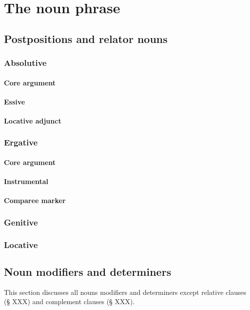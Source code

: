 \chapter{The noun phrase}

\section{Postpositions and relator nouns}

\subsection{Absolutive}
\subsubsection{Core argument}
\subsubsection{Essive}
\subsubsection{Locative adjunct}

\subsection{Ergative}
\subsubsection{Core argument}
\subsubsection{Instrumental}
\subsubsection{Comparee marker}

\subsection{Genitive}
\subsection{Locative}
\section{Noun modifiers and determiners}
This section discusses all nouns modifiers and determiners except relative clauses (§ XXX) and complement clauses (§ XXX). 

